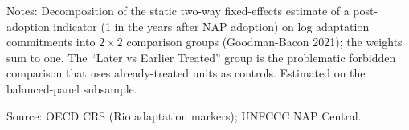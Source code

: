 \begin{table}[H]
\centering
\caption{Goodman-Bacon decomposition of the two-way fixed-effects estimator}
\label{tab:bacon}
\begingroup\small
{}
\endgroup
\par\vspace{4pt}
\begin{minipage}{\linewidth}\footnotesize
Notes: Decomposition of the static two-way fixed-effects estimate of a post-adoption indicator (1 in the years after NAP adoption) on log adaptation commitments into $2\times2$ comparison groups (Goodman-Bacon 2021); the weights sum to one. The ``Later vs Earlier Treated'' group is the problematic forbidden comparison that uses already-treated units as controls. Estimated on the balanced-panel subsample.\par
Source: OECD CRS (Rio adaptation markers); UNFCCC NAP Central.
\end{minipage}
\end{table}
